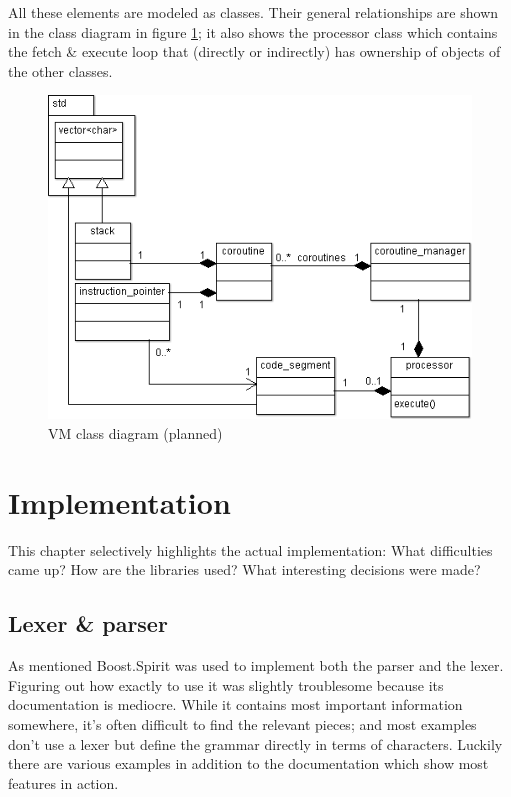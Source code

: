 			All these elements are modeled as classes. Their general relationships are shown in the class diagram in figure \ref{fig:vm_class_diagram}; it also shows the processor class which contains the fetch \& execute loop that (directly or indirectly) has ownership of objects of the other classes.
			
			\begin{figure}
			\centering
			\includegraphics[width=\textwidth]{figures/vm_classes_cropped}
			\caption{VM class diagram (planned)}
			\label{fig:vm_class_diagram}
			\end{figure}

\chapter{Implementation}

	This chapter selectively highlights the actual implementation: What difficulties came up? How are the libraries used? What interesting decisions were made?
	
	\section{Lexer \& parser}
		
		As mentioned Boost.Spirit was used to implement both the parser and the lexer. Figuring out how exactly to use it was slightly troublesome because its documentation is mediocre. While it contains most important information somewhere, it's often difficult to find the relevant pieces; and most examples don't use a lexer but define the grammar directly in terms of characters. Luckily there are various examples in addition to the documentation which show most features in action.
		

